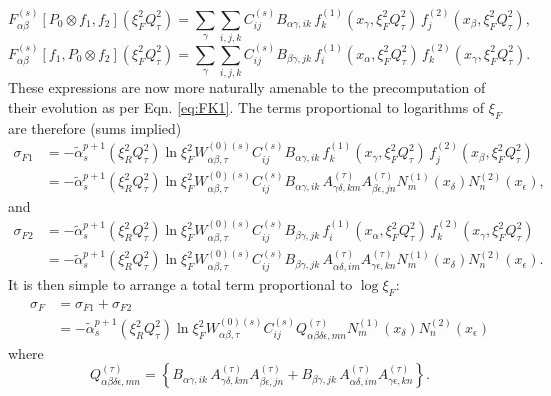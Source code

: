 \documentclass[11pt]{article}
\newcommand{\be}{\begin{equation}}
\newcommand{\ee}{\end{equation}}
\begin{document}
\be \label{eq:deconvsubprocess1} F^{(s)}_{\alpha\beta}[P_0\otimes f_1, f_2](\xi_F^2{Q^2_\tau})=\sum_\gamma \sum_{i,j,k} C^{(s)}_{ij} B_{\alpha\gamma, ik} \, 
 f_k^{(1)}(x_\gamma, \xi_F^2Q_\tau^2)\, f_j^{(2)}(x_{\beta},\xi_F^2Q^2_\tau), \ee
\be \label{eq:deconvsubprocess1} F^{(s)}_{\alpha\beta}[f_1, P_0\otimes f_2](\xi_F^2{Q^2_\tau})=\sum_\gamma \sum_{i,j,k} C^{(s)}_{ij} B_{\beta\gamma, jk} \, 
 f_i^{(1)}(x_\alpha, \xi_F^2Q_\tau^2)\, f_k^{(2)}(x_{\gamma},\xi_F^2Q^2_\tau). \ee
 These expressions are now more naturally amenable to the precomputation of their evolution as per Eqn. \ref{eq:FK1}. The terms proportional to logarithms of $\xi_F$ are therefore (sums implied)
 \begin{align}
\sigma_{F1} &=
-\tilde{\alpha}_s^{p+1}(\xi_R^2Q^2_\tau)
\ln \xi_F^2  
W_{\alpha\beta,\tau}^{(0)(s)} C^{(s)}_{ij} B_{\alpha\gamma, ik} \, 
 f_k^{(1)}(x_\gamma, \xi_F^2Q_\tau^2)\, f_j^{(2)}(x_{\beta},\xi_F^2Q^2_\tau) \nonumber \\
 &=
 -\tilde{\alpha}_s^{p+1}(\xi_R^2Q^2_\tau)
\ln \xi_F^2  
W_{\alpha\beta,\tau}^{(0)(s)} C^{(s)}_{ij} B_{\alpha\gamma, ik} \, 
A^{(\tau)}_{\gamma\delta, km} A^{(\tau)}_{\beta\epsilon, jn} N^{(1)}_{m}(x_\delta) N^{(2)}_{n}(x_\epsilon),
 \end{align}
and
\begin{align}
\sigma_{F2} &=
-\tilde{\alpha}_s^{p+1}(\xi_R^2Q^2_\tau) \ln \xi_F^2  
W_{\alpha\beta,\tau}^{(0)(s)} C^{(s)}_{ij} B_{\beta\gamma, jk} \, 
 f_i^{(1)}(x_\alpha, \xi_F^2Q_\tau^2)\, f_k^{(2)}(x_{\gamma},\xi_F^2Q^2_\tau) \nonumber \\
 &=
-\tilde{\alpha}_s^{p+1}(\xi_R^2Q^2_\tau) \ln \xi_F^2  
W_{\alpha\beta,\tau}^{(0)(s)} C^{(s)}_{ij} B_{\beta\gamma, jk} \, 
A^{(\tau)}_{\alpha\delta, im} A^{(\tau)}_{\gamma\epsilon, kn} N^{(1)}_{m}(x_\delta) N^{(2)}_{n}(x_\epsilon).
\end{align}
It is then simple to arrange a total term proportional to $\log \xi_F$:
\begin{align}
\sigma_F &= \sigma_{F1} + \sigma_{F2}\\
&= -\tilde{\alpha}_s^{p+1}(\xi_R^2Q^2_\tau) \ln \xi_F^2  W_{\alpha\beta,\tau}^{(0)(s)} C^{(s)}_{ij}  Q_{\alpha\beta\delta\epsilon, mn}^{(\tau)} N^{(1)}_{m}(x_\delta) N^{(2)}_{n}(x_\epsilon)
\end{align}
where
\be
Q_{\alpha\beta\delta\epsilon, mn}^{(\tau)} = \left\{ B_{\alpha\gamma, ik} \, 
A^{(\tau)}_{\gamma\delta, km} A^{(\tau)}_{\beta\epsilon, jn} +  B_{\beta\gamma, jk} \, 
A^{(\tau)}_{\alpha\delta, im} A^{(\tau)}_{\gamma\epsilon, kn}  \right\}.
\ee


 
\clearpage
\begin{thebibliography}{1}



\end{thebibliography}
\end{document}

